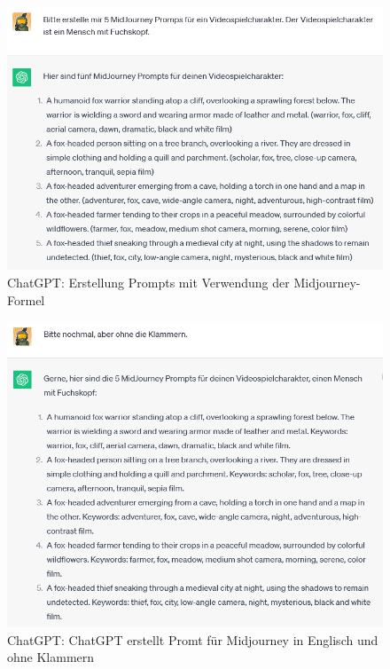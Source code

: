 \begin{figure}[h]
	\centering
	\includegraphics[width=14cm]{BilderFuerBA/05.png}
	\caption{ChatGPT: Erstellung Prompts mit Verwendung der Midjourney-Formel}
	\label{chatgpt_mj-formel_mit_Klammern}
\end{figure}
\begin{figure}[h]
	\centering
	\includegraphics[scale=0.7]{BilderFuerBA/06.png}
	\caption{ChatGPT: ChatGPT erstellt Promt für Midjourney in Englisch und ohne Klammern}
	\label{chatgpt_mj-formel_ohne_Klammern}
\end{figure}
\\
